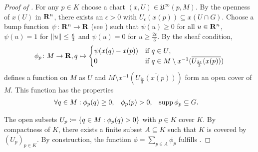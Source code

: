 \begin{proof}[Proof of ]
  For any $p \in K$ choose a chart $(x, U) \in \mathfrak U^\infty(p, M)$. 
  By the openness of $x(U)$ in $\mathbf{R}^n$, there exists an $\epsilon > 0$ with
  $U_\epsilon(x(p)) \subseteq x(U \cap G)$. Choose a bump function $\psi\colon \mathbf{R}^n \to
  \mathbf{R}$ (see ) such that $\psi(u) \ge 0$ for all
  $u \in \mathbf{R}^n$, $\psi(u) = 1$ for
  $\lVert u\rVert \leq \frac \epsilon 3$ and $\psi(u) = 0$ for $u \ge \frac {2 \epsilon} 3$.
  By the sheaf condition, 
  \[
    \phi_p\colon M \to \mathbf{R}, q \mapsto \begin{cases}
      \psi(x(q) - x(p)) & \text{if $q \in U$}, \\
      0 & \text{if $q \in M \setminus x^{-1}(\overline{U_{\frac {2 \epsilon} 3}(x(p))})$}
    \end{cases}
  \]
  defines a function on $M$ as $U$ and $M \setminus x^{-1}(\overline{U_{\frac {2 \epsilon} 3}(x(p))})$
  form an open cover of $M$. This function has the properties
  \begin{align*}
    \forall q \in M: \phi_p(q) & \ge 0, &
    \phi_p(p) & > 0, &
    \operatorname{supp} \phi_p & \subseteq G.
  \end{align*}
  
  The open subsets $U_p \coloneqq \lbrace q \in M : \phi_p(q) > 0\rbrace$ with $p \in K$ cover $K$. By
  compactness of $K$, there exists a finite subset $A \subseteq K$ such that
  $K$ is covered by $(U_p)_{p \in K}$. By construction, the function
  $\phi = \sum_{p \in A} \phi_p$
  fulfills .
\end{proof}

